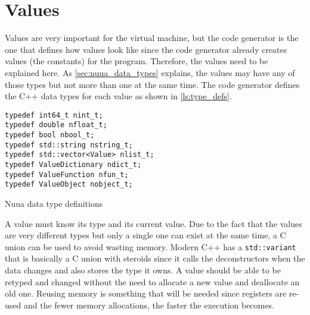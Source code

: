 \section{Values}

Values are very important for the virtual machine, but the code generator is the one that defines how values look like since the code generator
already creates values (the constants) for the program. Therefore, the values need to be explained here. As \autoref{sec:nuua_data_types} explains, the
values may have any of those types but not more than one at the same time. The code generator defines the C++ data types for each value as
shown in \autoref{ls:type_defs}.

\begin{listing}[H]
\begin{verbatim}
typedef int64_t nint_t;
typedef double nfloat_t;
typedef bool nbool_t;
typedef std::string nstring_t;
typedef std::vector<Value> nlist_t;
typedef ValueDictionary ndict_t;
typedef ValueFunction nfun_t;
typedef ValueObject nobject_t;
\end{verbatim}
\caption{Nuua data type definitions}
\label{ls:type_defs}
\end{listing}

A value must know its type and its current value. Due to the fact that the values are very different types but only a single one can exist at the same time, a
C union can be used to avoid wasting memory. Modern C++ has a \texttt{std::variant} that is basically a C union with steroids since it calls the
deconstructors when the data changes and also stores the type it owns. A value should be able to be retyped and changed without the need to
allocate a new value and deallocate an old one. Reusing memory is something that will be needed since registers are re-used and the fewer memory allocations,
the faster the execution becomes.

